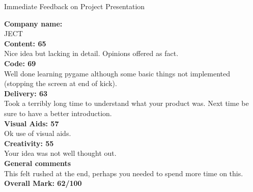 \documentclass{article}
\begin{document}
\begin{center}
\Huge{Immediate Feedback on Project Presentation}\\
\end{center}


\normalsize
\textbf{Company name:}\\

JECT\\

\textbf{Content: 65}\\

Nice idea but lacking in detail.
Opinions offered as fact.\\

\textbf{Code: 69}\\

Well done learning pygame although some basic things not implemented (stopping the screen at end of kick).\\


\textbf{Delivery: 63}\\

Took a terribly long time to understand what your product was.
Next time be sure to have a better introduction.\\


\textbf{Visual Aids: 57}\\

Ok use of visual aids.\\

\textbf{Creativity: 55}\\

Your idea was not well thought out.\\

\textbf{General comments}\\

This felt rushed at the end, perhaps you needed to spend more time on this.\\

\textbf{Overall Mark: 62/100}
\end{document}
